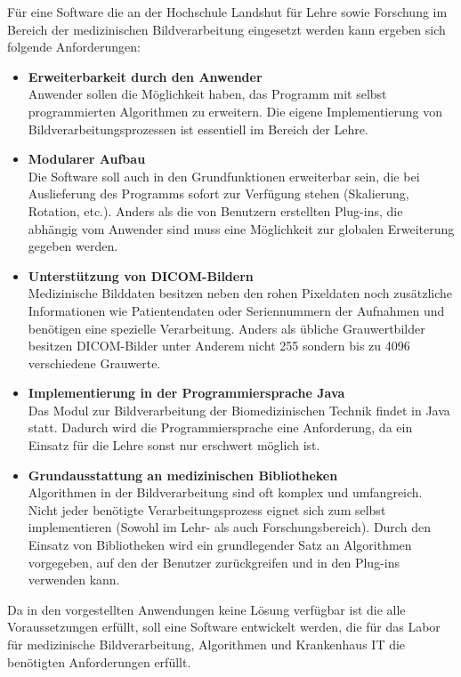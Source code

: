 Für eine Software die an der Hochschule Landshut für Lehre sowie Forschung im Bereich der medizinischen Bildverarbeitung eingesetzt werden kann ergeben sich folgende Anforderungen:

\begin{itemize}
\item \textbf{Erweiterbarkeit durch den Anwender} \\
	  Anwender sollen die Möglichkeit haben, das Programm mit selbst programmierten Algorithmen zu erweitern. Die eigene Implementierung von Bildverarbeitungsprozessen ist essentiell im Bereich der Lehre.
\item \textbf{Modularer Aufbau} \\
	  Die Software soll auch in den Grundfunktionen erweiterbar sein, die bei Auslieferung des Programms sofort zur Verfügung stehen (Skalierung, Rotation, etc.). Anders als die von Benutzern erstellten Plug-ins, die abhängig vom Anwender sind muss eine Möglichkeit zur globalen Erweiterung gegeben werden.
\item \textbf{Unterstützung von DICOM-Bildern}\\
	  Medizinische Bilddaten besitzen neben den rohen Pixeldaten noch zusätzliche Informationen wie Patientendaten oder Seriennummern der Aufnahmen und benötigen eine spezielle Verarbeitung. Anders als übliche Grauwertbilder besitzen DICOM-Bilder unter Anderem nicht 255 sondern bis zu 4096 verschiedene Grauwerte.
\item \textbf{Implementierung in der Programmiersprache Java}\\
	  Das Modul zur Bildverarbeitung der Biomedizinischen Technik findet in Java statt. Dadurch wird die Programmiersprache eine Anforderung, da ein Einsatz für die Lehre sonst nur erschwert möglich ist.
\item \textbf{Grundausstattung an medizinischen Bibliotheken}\\
	  Algorithmen in der Bildverarbeitung sind oft komplex und umfangreich. Nicht jeder benötigte Verarbeitungsprozess eignet sich zum selbst implementieren (Sowohl im Lehr- als auch Forschungsbereich). Durch den Einsatz von Bibliotheken wird ein grundlegender Satz an Algorithmen vorgegeben, auf den der Benutzer zurückgreifen und in den Plug-ins verwenden kann.
\end{itemize}

Da in den vorgestellten Anwendungen keine Lösung verfügbar ist die alle Voraussetzungen erfüllt, soll eine Software entwickelt werden, die für das Labor für medizinische Bildverarbeitung, Algorithmen und Krankenhaus IT die benötigten Anforderungen erfüllt.